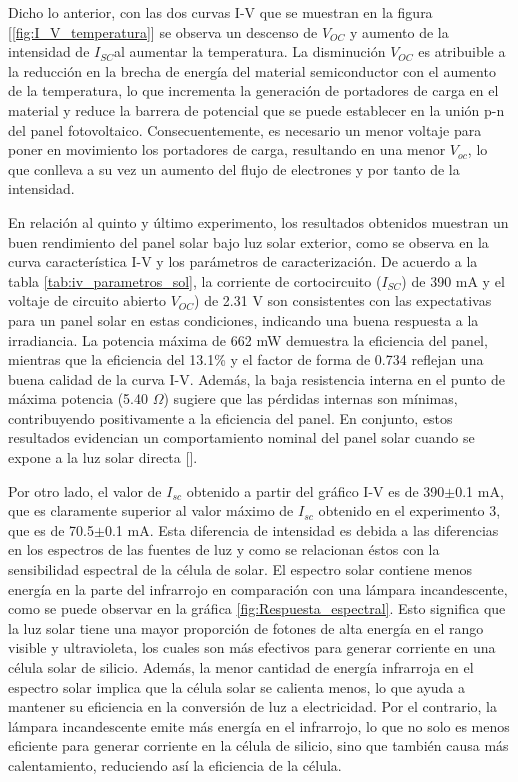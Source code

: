 Dicho lo anterior, con las dos curvas I-V que se muestran en la figura [\ref{fig:I_V_temperatura}] se observa  un descenso de $V_{OC}$  y aumento de la intensidad de $I_{SC}$al aumentar la temperatura. La disminución $V_{OC}$ es atribuible a la reducción en la brecha de energía del material semiconductor con el aumento de la temperatura, lo que incrementa la generación de portadores de carga en el material y reduce la barrera de potencial que se puede establecer en la unión p-n del panel fotovoltaico. Consecuentemente, es necesario un menor voltaje para poner en movimiento los portadores de carga, resultando en una menor $V_{oc}$, lo que conlleva a su vez un aumento del flujo de electrones y por tanto de la intensidad.

\vspace{\baselineskip}	


En relación al quinto y último experimento, los resultados obtenidos muestran un buen rendimiento del panel solar bajo luz solar exterior, como se observa en la curva característica I-V y los parámetros de caracterización.  De acuerdo a la tabla \ref{tab:iv_parametros_sol}, la corriente de cortocircuito ($I_{SC}$) de 390 mA y el voltaje de circuito abierto $V_{OC}$) de 2.31 V son consistentes con las expectativas para un panel solar en estas condiciones, indicando una buena respuesta a la irradiancia. La potencia máxima de 662 mW demuestra la eficiencia del panel, mientras que la eficiencia del 13.1\% y el factor de forma de 0.734 reflejan una buena calidad de la curva I-V. Además, la baja resistencia interna en el punto de máxima potencia (5.40 $\Omega$) sugiere que las pérdidas internas son mínimas, contribuyendo positivamente a la eficiencia del panel. En conjunto, estos resultados evidencian un comportamiento nominal del panel solar cuando se expone a la luz solar directa [\cite{solar_eff}].

\vspace{\baselineskip}	

Por otro lado, el valor de $I_{sc}$ obtenido a partir del gráfico I-V es de 390$\pm$0.1 mA, que es claramente superior al valor máximo de  $I_{sc}$ obtenido en el experimento 3, que es de 70.5$\pm$0.1 mA. Esta diferencia de intensidad es debida a las diferencias en los espectros de las fuentes de luz y como se relacionan éstos con la sensibilidad espectral de la célula de solar. El espectro solar contiene menos energía en la parte del infrarrojo en comparación con una lámpara incandescente, como se puede observar en la gráfica \ref{fig:Respuesta_espectral}. Esto significa que la luz solar tiene una mayor proporción de fotones de alta energía en el rango visible y ultravioleta, los cuales son más efectivos para generar corriente en una célula solar de silicio. Además, la menor cantidad de energía infrarroja en el espectro solar implica que la célula solar se calienta menos, lo que ayuda a mantener su eficiencia en la conversión de luz a electricidad. Por el contrario, la lámpara incandescente emite más energía en el infrarrojo, lo que no solo es menos eficiente para generar corriente en la célula de silicio, sino que también causa más calentamiento, reduciendo así la eficiencia de la célula.
 
